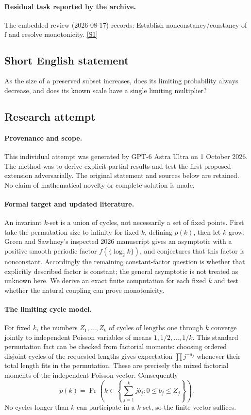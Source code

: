 \documentclass[11pt,a4paper]{article}
\newcommand{\sref}[2]{\hyperlink{source:#1:#2}{[S#2]}}
\begin{document}
\paragraph{Residual task reported by the archive.}

The embedded review (2026-08-17) records: Establish nonconstancy/constancy of f and resolve monotonicity. \sref{141}{1}

\subsection{Short English statement}

As the size of a preserved subset increases, does its limiting probability always decrease, and does its known scale have a single limiting multiplier?

\subsection{Research attempt}

\paragraph{Provenance and scope.}
This individual attempt was generated by GPT-6 Astra Ultra on 1 October 2026. The method was to derive explicit partial results and test the first proposed extension adversarially. The original statement and sources below are retained. No claim of mathematical novelty or complete solution is made.

\paragraph{Formal target and updated literature.}
An invariant $k$-set is a union of cycles, not necessarily a set of fixed points. First take the permutation size to infinity for fixed $k$, defining $p(k)$, then let $k$ grow. Green and Sawhney's inspected 2026 manuscript gives an asymptotic with a positive smooth periodic factor $f(\{\log_2k\})$, and conjectures that this factor is nonconstant. Accordingly the remaining constant-factor question is whether that explicitly described factor is constant; the general asymptotic is not treated as unknown here. We derive an exact finite computation for each fixed $k$ and test whether the natural coupling can prove monotonicity.

\paragraph{The limiting cycle model.}
For fixed $k$, the numbers $Z_1,\ldots,Z_k$ of cycles of lengths one through $k$ converge jointly to independent Poisson variables of means $1,1/2,\ldots,1/k$. This standard permutation fact can be checked from factorial moments: choosing ordered disjoint cycles of the requested lengths gives expectation $\prod j^{-a_j}$ whenever their total length fits in the permutation. These are precisely the mixed factorial moments of the independent Poisson vector. Consequently
\[
 p(k)=\Pr\left(k\in\left\{\sum_{j=1}^k j b_j:0\leq b_j\leq Z_j\right\}\right).
\]
No cycles longer than $k$ can participate in a $k$-set, so the finite vector suffices.
\end{document}
